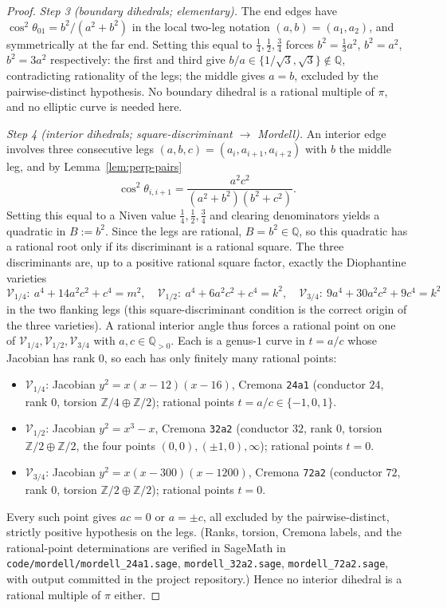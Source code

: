 \documentclass[11pt,a4paper]{article}
\theoremstyle{remark}
\theoremstyle{plain}
\begin{document}
\begin{proof}
\emph{Step 3 (boundary dihedrals; elementary).}  The end edges have
$\cos^2\theta_{01} = b^2/(a^2+b^2)$ in the local two-leg notation
$(a, b) = (a_1, a_2)$, and symmetrically at the far end.  Setting this
equal to $\tfrac14, \tfrac12, \tfrac34$ forces $b^2 = \tfrac13 a^2$,
$b^2 = a^2$, $b^2 = 3 a^2$ respectively: the first and third give
$b/a \in \{1/\sqrt3, \sqrt3\} \notin \mathbb{Q}$, contradicting
rationality of the legs; the middle gives $a = b$, excluded by the
pairwise-distinct hypothesis.  No boundary dihedral is a rational
multiple of $\pi$, and no elliptic curve is needed here.

\emph{Step 4 (interior dihedrals; square-discriminant $\to$ Mordell).}
An interior edge involves three consecutive legs $(a, b, c) =
(a_i, a_{i+1}, a_{i+2})$ with $b$ the middle leg, and by
Lemma~\ref{lem:perp-pairs}
\[
\cos^2\theta_{i,i+1} = \frac{a^2 c^2}{(a^2+b^2)(b^2+c^2)}.
\]
Setting this equal to a Niven value $\tfrac14, \tfrac12, \tfrac34$ and
clearing denominators yields a quadratic in $B := b^2$.  Since the legs
are rational, $B = b^2 \in \mathbb{Q}$, so this quadratic has a rational
root only if its discriminant is a rational square.  The three
discriminants are, up to a positive rational square factor, exactly the
Diophantine varieties
\[
\mathcal{V}_{1/4}:\ a^4 + 14 a^2 c^2 + c^4 = m^2,
\quad
\mathcal{V}_{1/2}:\ a^4 + 6 a^2 c^2 + c^4 = k^2,
\quad
\mathcal{V}_{3/4}:\ 9 a^4 + 30 a^2 c^2 + 9 c^4 = k^2
\]
in the two flanking legs (this square-discriminant condition is the
correct origin of the three varieties).  A rational interior angle thus
forces a rational point on one of $\mathcal{V}_{1/4}, \mathcal{V}_{1/2},
\mathcal{V}_{3/4}$ with $a, c \in \mathbb{Q}_{>0}$.  Each is a genus-$1$
curve in $t = a/c$ whose Jacobian has rank $0$, so each has only finitely
many rational points:
\begin{itemize}[leftmargin=*,itemsep=0.1em]
\item $\mathcal{V}_{1/4}$: Jacobian $y^2 = x(x-12)(x-16)$, Cremona
\texttt{24a1} (conductor $24$, rank $0$, torsion
$\mathbb{Z}/4 \oplus \mathbb{Z}/2$); rational points $t = a/c \in
\{-1, 0, 1\}$.
\item $\mathcal{V}_{1/2}$: Jacobian $y^2 = x^3 - x$, Cremona
\texttt{32a2} (conductor $32$, rank $0$, torsion
$\mathbb{Z}/2 \oplus \mathbb{Z}/2$, the four points
$(0,0), (\pm 1, 0), \infty$); rational points $t = 0$.
\item $\mathcal{V}_{3/4}$: Jacobian $y^2 = x(x-300)(x-1200)$, Cremona
\texttt{72a2} (conductor $72$, rank $0$, torsion
$\mathbb{Z}/2 \oplus \mathbb{Z}/2$); rational points $t = 0$.
\end{itemize}
Every such point gives $a c = 0$ or $a = \pm c$, all excluded by the
pairwise-distinct, strictly positive hypothesis on the legs.  (Ranks,
torsion, Cremona labels, and the rational-point determinations are
verified in SageMath in \texttt{code/mordell/mordell\_24a1.sage},
\texttt{mordell\_32a2.sage}, \texttt{mordell\_72a2.sage}, with output
committed in the project repository.)  Hence no interior dihedral is a
rational multiple of $\pi$ either.


\end{proof}
\end{document}
